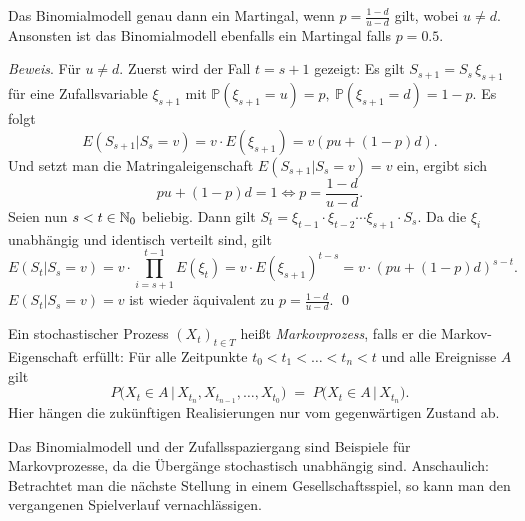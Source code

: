 \begin{bsp}
Das Binomialmodell genau dann ein Martingal, wenn $p=\frac{1-d}{u-d}$ gilt, wobei $u \neq d$. 
Ansonsten ist das Binomialmodell ebenfalls ein Martingal falls $p=0.5$.

\textit{Beweis}. Für $u \neq d$.
Zuerst wird der Fall $t = s + 1$ gezeigt:
Es gilt $S_{s+1}=S_s\,\xi_{s+1}$ für eine Zufallsvariable $\xi_{s+1}$ mit $\mathbb{P}(\xi_{s+1}=u)=p,\ \mathbb{P}(\xi_{s+1}=d)=1-p$. Es folgt
$$E(S_{s+1}|S_s=v)= v \cdot E(\xi_{s+1})=v(pu+(1-p)d).$$
Und setzt man die Matringaleigenschaft $E(S_{s+1}|S_s=v)=v$ ein, ergibt sich
$$pu+(1-p)d=1 \iff p=\frac{1-d}{u-d}.$$
Seien nun $s < t \in \Bbb N_0$ beliebig. Dann gilt $S_t=\xi_{t-1}\cdot \xi_{t-2}\cdots \xi_{s+1}\cdot S_s$. 
Da die $\xi_i$ unabhängig und identisch verteilt sind, gilt
$$E(S_t|S_s=v)=v \cdot \prod_{i=s+1}^{t-1} E(\xi_t)=v \cdot E(\xi_{s+1})^{t-s}=v \cdot (pu+(1-p)d)^{s-t}.$$
$E(S_t|S_s=v)=v$ ist wieder äquivalent zu $p=\frac{1-d}{u-d}$. \qed
\end{bsp}

\begin{defi}[Markovprozess]
Ein stochastischer Prozess $(X_t)_{t \in T}$
heißt \emph{Markovprozess}, falls er die Markov-Eigenschaft erfüllt:  
Für alle Zeitpunkte $t_0 < t_1 < \dots < t_n < t$ und alle Ereignisse $A$ gilt
$$
  P\!\bigl( X_t \in A \,\big|\, X_{t_n}, X_{t_{n-1}}, \dots, X_{t_0} \bigr)
  \;=\;
  P\!\bigl( X_t \in A \,\big|\, X_{t_n} \bigr).
$$
Hier hängen die zukünftigen Realisierungen nur vom gegenwärtigen Zustand ab.
\end{defi}

\begin{bsp}
Das Binomialmodell und der Zufallsspaziergang sind Beispiele für Markovprozesse, da die Übergänge stochastisch unabhängig sind. Anschaulich: Betrachtet man die nächste Stellung in einem Gesellschaftsspiel, so kann man den vergangenen Spielverlauf vernachlässigen.
\end{bsp}